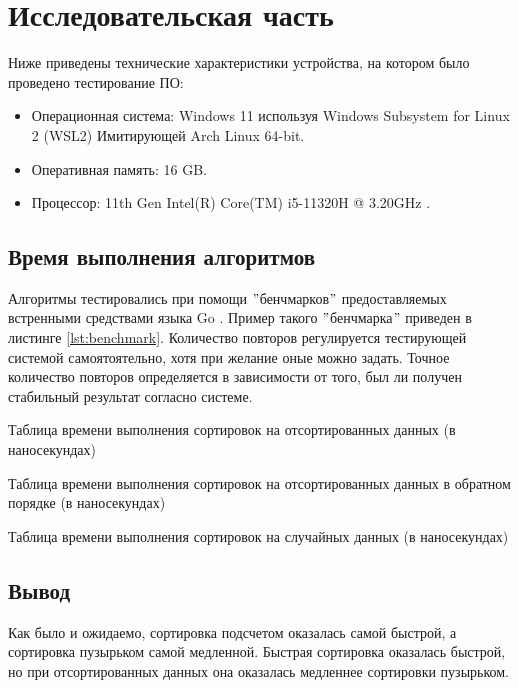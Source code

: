 \chapter{Исследовательская часть}
Ниже приведены технические характеристики устройства, на котором было проведено тестирование ПО:

\begin{itemize}
    \item Операционная система: Windows 11 используя Windows Subsystem for Linux 2 (WSL2) \cite{wsl2} Имитирующей Arch Linux \cite{arch} 64-bit.
    \item Оперативная память: 16 GB.
    \item Процессор: 11th Gen Intel(R) Core(TM) i5-11320H @ 3.20GHz \cite{i5}.
\end{itemize}

\section{Время выполнения алгоритмов}
Алгоритмы тестировались при помощи \("\)бенчмарков\("\) предоставляемых встренными средствами языка Go \cite{go}.
Пример такого \("\)бенчмарка\("\) приведен в листинге \ref{lst:benchmark}.
Количество повторов регулируется тестирующей системой самоятоятельно, хотя при желание оные можно задать.
Точное количество повторов определяется в зависимости от того, был ли получен стабильный результат согласно системе.



Таблица времени выполнения сортировок на отсортированных данных (в наносекундах)\newline
%

Таблица времени выполнения сортировок на отсортированных данных в обратном порядке (в наносекундах)\newline
%

Таблица времени выполнения сортировок на случайных данных (в наносекундах)\newline


\section{Вывод}

Как было и ожидаемо, сортировка подсчетом оказалась самой быстрой, а сортировка пузырьком самой медленной.
Быстрая сортировка оказалась быстрой, но при отсортированных данных она оказалась медленнее сортировки пузырьком.
